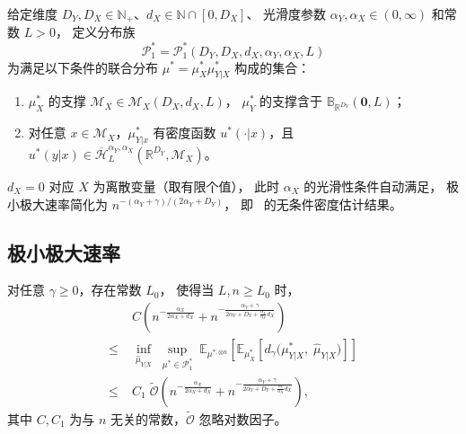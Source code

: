 \begin{Definition}\label{def:regime1}
    给定维度 $D_Y, D_X \in \mathbb{N}_+$、$d_X \in \mathbb{N} \cap [0, D_X]$、
    光滑度参数 $\alpha_Y, \alpha_X \in (0, \infty)$ 和常数 $L > 0$，
    定义分布族
    \[
        \mathcal{P}_1^* = \mathcal{P}_1^*(D_Y, D_X, d_X, \alpha_Y, \alpha_X, L)
    \]
    为满足以下条件的联合分布 $\mu^* = \mu^*_X\mu^*_{Y|X}$ 构成的集合：
    \begin{enumerate}
        \item $\mu^*_X$ 的支撑 $\mathcal{M}_X \in \mathcal{M}_X(D_X, d_X, L)$，
              $\mu^*_Y$ 的支撑含于 $\mathbb{B}_{\mathbb{R}^{D_Y}}(\mathbf{0}, L)$；
        \item 对任意 $x \in \mathcal{M}_X$，$\mu^*_{Y|x}$ 有密度函数
              $u^*(\cdot|x)$，且
              $u^*(y|x) \in \overline{\mathcal{H}}^{\alpha_Y, \alpha_X}_L
                 (\mathbb{R}^{D_Y}, \mathcal{M}_X)$。
    \end{enumerate}
\end{Definition}

\begin{Remark}\label{rem:dX-zero}
    $d_X = 0$ 对应 $X$ 为离散变量（取有限个值），
    此时 $\alpha_X$ 的光滑性条件自动满足，
    极小极大速率简化为 $n^{-(\alpha_Y+\gamma)/(2\alpha_Y+D_Y)}$，
    即~\citep{Li2022} 的无条件密度估计结果。
\end{Remark}

\subsection{极小极大速率}\label{sec:ch2-regime1-rate}

\begin{Theorem}\label{def:thm-regime1}
    对任意 $\gamma \geq 0$，存在常数 $L_0$，
    使得当 $L, n \geq L_0$ 时，
    \begin{equation}\label{eq:regime1-minimax}
        \begin{aligned}
            & C\!\left(
                n^{-\frac{\alpha_X}{2\alpha_X + d_X}}
                + n^{-\frac{\alpha_Y + \gamma}{2\alpha_Y + D_Y + \frac{\alpha_Y}{\alpha_X}d_X}}
            \right) \\
            \leq\;&
            \inf_{\widehat{\mu}_{Y|X}}\;
            \sup_{\mu^* \in \mathcal{P}_1^*}
            \;
            \mathbb{E}_{\mu^{*,\otimes n}}\!\left[
                \mathbb{E}_{\mu^*_X}\!\left[
                    d_\gamma\!\big(\mu^*_{Y|X},\; \widehat{\mu}_{Y|X}\big)
                \right]
            \right] \\
            \leq\;&
            C_1\;\widetilde{\mathcal{O}}\!\left(
                n^{-\frac{\alpha_X}{2\alpha_X + d_X}}
                + n^{-\frac{\alpha_Y + \gamma}{2\alpha_Y + D_Y + \frac{\alpha_Y}{\alpha_X}d_X}}
            \right),
        \end{aligned}
    \end{equation}
    其中 $C, C_1$ 为与 $n$ 无关的常数，$\widetilde{\mathcal{O}}$ 忽略对数因子。
\end{Theorem}

